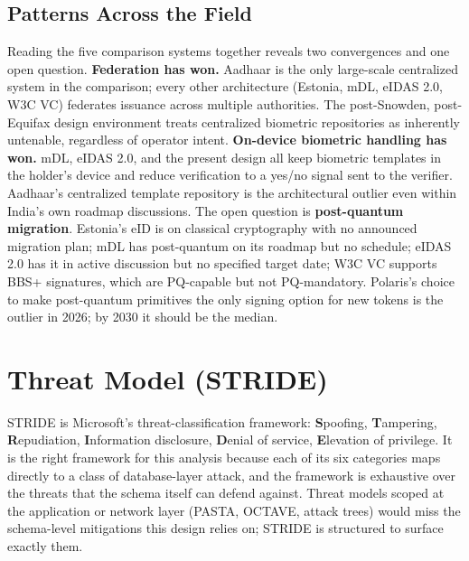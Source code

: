 \documentclass[11pt,letterpaper]{article}
\begin{document}
\subsection*{Patterns Across the Field}

Reading the five comparison systems together reveals two convergences and one open question. \textbf{Federation has won.} Aadhaar is the only large-scale centralized system in the comparison; every other architecture (Estonia, mDL, eIDAS 2.0, W3C VC) federates issuance across multiple authorities. The post-Snowden, post-Equifax design environment treats centralized biometric repositories as inherently untenable, regardless of operator intent. \textbf{On-device biometric handling has won.} mDL, eIDAS 2.0, and the present design all keep biometric templates in the holder's device and reduce verification to a yes/no signal sent to the verifier. Aadhaar's centralized template repository is the architectural outlier even within India's own roadmap discussions. The open question is \textbf{post-quantum migration}. Estonia's eID is on classical cryptography with no announced migration plan; mDL has post-quantum on its roadmap but no schedule; eIDAS 2.0 has it in active discussion but no specified target date; W3C VC supports BBS+ signatures, which are PQ-capable but not PQ-mandatory. Polaris's choice to make post-quantum primitives the only signing option for new tokens is the outlier in 2026; by 2030 it should be the median.

\section{Threat Model (STRIDE)}
\label{app:threat-model}

STRIDE is Microsoft's threat-classification framework: \textbf{S}poofing, \textbf{T}ampering, \textbf{R}epudiation, \textbf{I}nformation disclosure, \textbf{D}enial of service, \textbf{E}levation of privilege. It is the right framework for this analysis because each of its six categories maps directly to a class of database-layer attack, and the framework is exhaustive over the threats that the schema itself can defend against. Threat models scoped at the application or network layer (PASTA, OCTAVE, attack trees) would miss the schema-level mitigations this design relies on; STRIDE is structured to surface exactly them.
\end{document}
